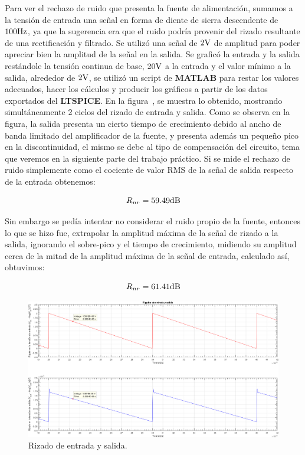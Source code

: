 \vspace{1.5cm}


Para ver el rechazo de ruido que presenta la fuente de alimentación, sumamos a la tensión de entrada una señal en forma de diente de sierra descendente de $100 \si[per-mode=symbol]{\hertz}$, ya que la sugerencia era que el ruido podría provenir del rizado resultante de una rectificación y filtrado. Se utilizó una señal de $2 \si[per-mode=symbol]{\volt}$ de amplitud para poder apreciar bien la amplitud de la señal en la salida. Se graficó la entrada y la salida restándole la tensión continua de base, $20 \si[per-mode=symbol]{\volt}$ a la entrada y el valor mínimo a la salida, alrededor de $2 \si[per-mode=symbol]{\volt}$, se utilizó un script de \textbf{MATLAB} para restar los valores adecuados, hacer los cálculos y producir los gráficos a partir de los datos exportados del \textbf{LTSPICE}. En la figura~, se muestra lo obtenido, mostrando simultáneamente 2 ciclos del rizado de entrada y salida.
Como se observa en la figura, la salida presenta un cierto tiempo de crecimiento debido al ancho de banda limitado del amplificador de la fuente, y presenta además un pequeño pico en la discontinuidad, el mismo se debe al tipo de compensación del circuito, tema que veremos en la siguiente parte del trabajo práctico. Si se mide el rechazo de ruido simplemente como el cociente de valor RMS de la señal de salida respecto de la entrada obtenemos:


\begin{equation}
    R_{nr}= 59.49 \si[per-mode=symbol]{\decibel}
\end{equation}

Sin embargo se pedía intentar no considerar el ruido propio de la fuente, entonces lo que se hizo fue, extrapolar la amplitud máxima de la señal de rizado a la salida, ignorando el sobre-pico y el tiempo de crecimiento, midiendo su amplitud cerca de la mitad de la amplitud máxima de la señal de entrada, calculado así, obtuvimos:


\begin{equation}
    R_{nr}= 61.41 \si[per-mode=symbol]{\decibel}
\end{equation}

\vfill

\clearpage

\begin{figure}[H] %
\begin{center}
\includegraphics[width=1.2 \textwidth, angle=90]{./img/preguntas/p20.png}
\caption{\label{fig:fig_p20_ripple}\footnotesize{Rizado de entrada y salida.}}
\end{center}
\end{figure}

\clearpage